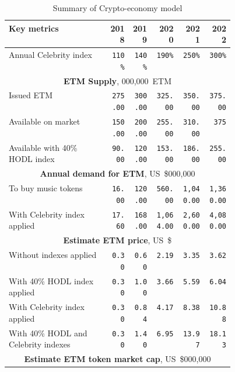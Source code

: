 \documentclass[12pt]{report}
\begin{document}
\begin{table}[H]
\centering
\caption{Summary of Crypto-economy model}
\begin{tabular}{p{0.45\linewidth}rrrrr}
\toprule
Key metrics & 2018 & 2019 & 2020 & 2021 & 2022 \\
\bottomrule

Annual Celebrity index & 
\texttt{110\%} & \texttt{140\%} & \texttt{190\%} & \texttt{250\%} & \texttt{300\%}\\

\midrule
\multicolumn{6}{c}{\textbf{ETM Supply}, 000,000~ETM} \\
\midrule
Issued ETM & 
\texttt{275.00} & \texttt{300.00} & \texttt{325.00} & \texttt{350.00} & \texttt{375.00}\\
Available on market & 
\texttt{150.00} & \texttt{200.00} & \texttt{255.00} & \texttt{310.00} & \texttt{375}\\
Available with 40\% HODL index & 
\texttt{90.00} & \texttt{120.00} & \texttt{153.00} & \texttt{186.00} & \texttt{255.00} \\

\midrule
\multicolumn{6}{c}{\textbf{Annual demand for ETM}, US~\$000,000} \\
\midrule
To buy music tokens & 
\texttt{16.00} & \texttt{120.00} & \texttt{560.00} & \texttt{1,040.00} & \texttt{1,360.00} \\
With Celebrity index applied & 
\texttt{17.60} & \texttt{168.00} & \texttt{1,064.00} & \texttt{2,600.00} & \texttt{4,080.00} \\

\midrule
\multicolumn{6}{c}{\textbf{Estimate ETM price}, US~\$} \\
\midrule

Without indexes applied & 
\texttt{0.30} & \texttt{0.60} & \texttt{2.19} & \texttt{3.35} & \texttt{3.62} \\
With 40\% HODL index applied & 
\texttt{0.30} & \texttt{1.00} & \texttt{3.66} & \texttt{5.59} & \texttt{6.04} \\
With Celebrity index applied & 
\texttt{0.30} & \texttt{0.84} & \texttt{4.17} & \texttt{8.38} & \texttt{10.88} \\ With 40\% HODL and Celebrity indexes & 
\texttt{0.30} & \texttt{1.40} & \texttt{6.95} & \texttt{13.97} & \texttt{18.13} \\

\midrule
\multicolumn{6}{c}{\textbf{Estimate ETM token market cap}, US~\$000,000} \\
\midrule


\end{tabular}
\end{table}
\end{document}
